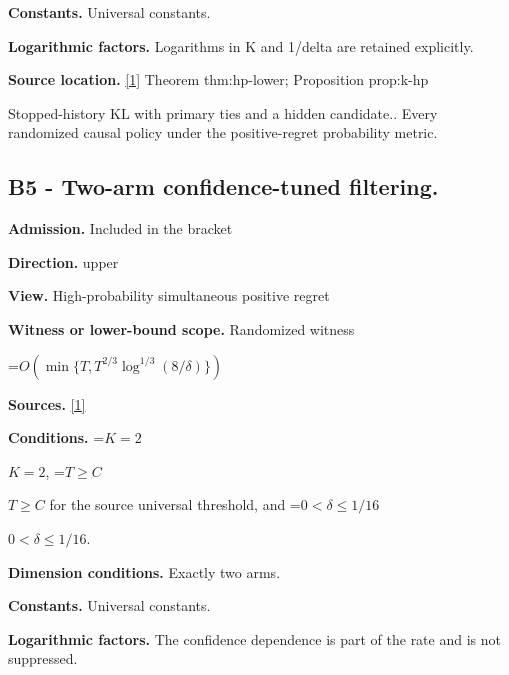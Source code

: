 \documentclass[10pt,a4paper]{article}
\newcommand{\AtlasMath}[1]{\par\begingroup\centering\setbox0=\hbox{$\displaystyle #1$}\ifdim\wd0>1.4\linewidth\typeout{ATLAS WIDE FORMULA: \the\wd0}\fi\ifdim\wd0>\linewidth\resizebox{\linewidth}{!}{\box0}\else\box0\fi\par\endgroup}
\newcommand{\AtlasInlineMath}[1]{\begingroup\setbox0=\hbox{$#1$}\ifdim\wd0>.4\linewidth\endgroup\AtlasMath{#1}\else\endgroup$#1$\fi}
\begin{document}
\textbf{Constants.} Universal constants.



\textbf{Logarithmic factors.} Logarithms in K and 1/delta are retained explicitly.



\textbf{Source location.} \href{https://github.com/WU-Wendao/Colombo/blob/main/colombo_sensorium/Complexity_altas/data/sources/colombo/U07/manuscript.pdf}{[1]} Theorem thm:hp-lower; Proposition prop:k-hp



Stopped-history KL with primary ties and a hidden candidate.. Every randomized causal policy under the positive-regret probability metric.



\subsection{B5 - Two-arm confidence-tuned filtering.}


\textbf{Admission.} Included in the bracket



\textbf{Direction.} upper



\textbf{View.} High-probability simultaneous positive regret



\textbf{Witness or lower-bound scope.} Randomized witness



\AtlasMath{O\!\left(\min\{T,T^{2/3}\log^{1/3}(8/\delta)\}\right)}


\textbf{Sources.} \href{https://github.com/WU-Wendao/Colombo/blob/main/colombo_sensorium/Complexity_altas/data/sources/colombo/U07/manuscript.pdf}{[1]}



\textbf{Conditions.} \AtlasInlineMath{K=2}, \AtlasInlineMath{T\ge C} for the source universal threshold, and \AtlasInlineMath{0<\delta\le1/16}.



\textbf{Dimension conditions.} Exactly two arms.



\textbf{Constants.} Universal constants.



\textbf{Logarithmic factors.} The confidence dependence is part of the rate and is not suppressed.
\end{document}

